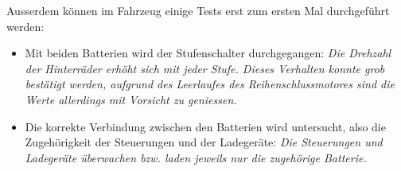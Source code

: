 Ausserdem können im Fahrzeug einige Tests erst zum ersten Mal durchgeführt werden: \begin{itemize}
	\item Mit beiden Batterien wird der Stufenschalter durchgegangen: \textit{Die Drehzahl der Hinterräder erhöht sich mit jeder Stufe. Dieses Verhalten konnte grob bestätigt werden, aufgrund des Leerlaufes des Reihenschlussmotores sind die Werte allerdings mit Vorsicht zu geniessen.}
	\item Die korrekte Verbindung zwischen den Batterien wird untersucht, also die Zugehörigkeit der Steuerungen und der Ladegeräte: \textit{Die Steuerungen und Ladegeräte überwachen bzw. laden jeweils nur die zugehörige Batterie.}
\end{itemize}



\color{black}